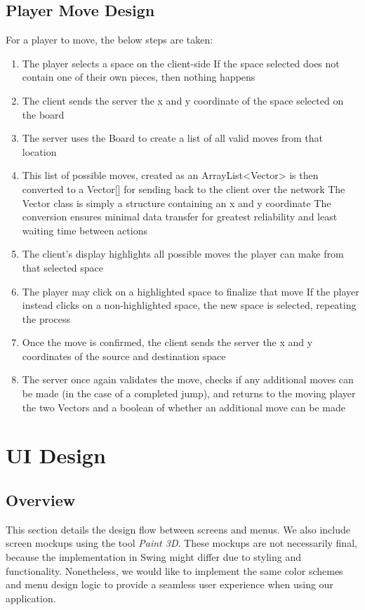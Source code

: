 \documentclass{scrreprt}
\begin{document}
	\section{Player Move Design}
		For a player to move, the below steps are taken:
		\begin{enumerate} [label*=\arabic*.]
		\item The player selects a space on the client-side
			\subitem If the space selected does not contain one of their own pieces, then nothing happens
		\item The client sends the server the x and y coordinate of the space selected on the board
		\item The server uses the Board to create a list of all valid moves from that location
		\item This list of possible moves, created as an ArrayList<Vector> is then converted to a Vector[] for sending back to the client over the network
			\subitem The Vector class is simply a structure containing an x and y coordinate
			\subitem The conversion ensures minimal data transfer for greatest reliability and least waiting time between actions
		\item The client's display highlights all possible moves the player can make from that selected space
		\item The player may click on a highlighted space to finalize that move
			\subitem If the player instead clicks on a non-highlighted space, the new space is selected, repeating the process
		\item Once the move is confirmed, the client sends the server the x and y coordinates of the source and destination space
		\item The server once again validates the move, checks if any additional moves can be made (in the case of a completed jump), and returns to the moving player the two Vectors and a boolean of whether an additional move can be made
		\end{enumerate}
		

\chapter{UI Design}
	\section{Overview}
	This section details the design flow between screens and menus. We also include screen mockups using the tool \textit{Paint 3D}. These mockups are not necessarily final, because the implementation in Swing might differ due to styling and functionality. Nonetheless, we would like to implement the same color schemes and menu design logic to provide a seamless user experience when using our application. 	
\end{document}
